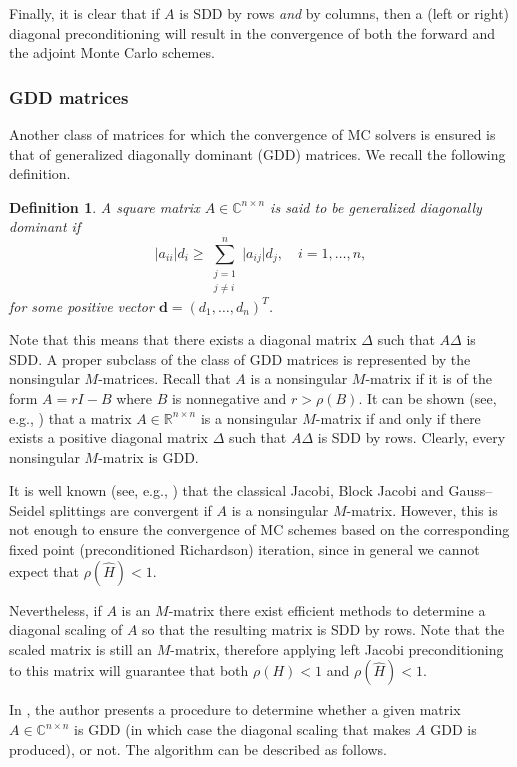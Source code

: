 \documentclass[final,leqno,onefignum,onetabnum]{siamltex1213}
\newtheorem{defn}{Definition}
\begin{document}
Finally, it is clear that if $A$ is SDD by rows {\em and} by columns, then
a (left or right) diagonal preconditioning will result in the convergence
of both the forward and the adjoint Monte Carlo schemes.

\subsubsection{GDD matrices}
\label{sec:gdd}

Another class of matrices for which the convergence of
MC solvers is ensured is that of generalized diagonally
dominant (GDD) matrices. We recall the following definition.

\begin{defn}
A square matrix $A\in\mathbb{C}^{n\times n}$ is said to be {\em generalized
diagonally dominant} if
\[
 \lvert a_{ii}\rvert d_i \ge \sum_{\substack{j=1\\j\ne i}}^n \lvert
a_{ij}\rvert
d_j, \quad i=1,\ldots,n,
\]
for some positive vector $\mathbf{d}=(d_1,\ldots,d_n)^T$.
\end{defn}

Note that this means that there exists a diagonal matrix  $\Delta$
such that $A\Delta$ is SDD.
A proper subclass of the class of GDD matrices is represented
by the nonsingular $M$-matrices.
Recall that $A$ is a nonsingular $M$-matrix if it is of the form
$A=r I - B$ where $B$ is nonnegative and $r>\rho(B)$.
It can be shown (see, e.g., \cite{BP1979}) that  a matrix
$A\in\mathbb{R}^{n\times n}$ is a nonsingular $M$-matrix if and only
if there exists a positive diagonal matrix $\Delta$ such that
$A\Delta$ is SDD by rows. Clearly, every
nonsingular $M$-matrix is GDD.

It is well known (see, e.g., \cite{Ax1994}) that the classical
Jacobi, Block Jacobi and Gauss--Seidel splittings are
convergent if $A$ is a nonsingular $M$-matrix.
However, this is not enough to ensure the
convergence of MC schemes based on the corresponding fixed point
(preconditioned Richardson) iteration, since in general
we cannot expect that $\rho(\hat{H})<1$.

Nevertheless, if $A$ is an $M$-matrix there exist efficient methods
to determine a diagonal scaling of $A$ so that the resulting matrix
is SDD by rows. Note that the scaled matrix is still an $M$-matrix,
therefore applying left Jacobi preconditioning to this matrix will
guarantee that both $\rho(H)<1$ and $\rho(\hat{H})<1$.

In \cite{Li2002}, the author presents a procedure to determine
whether a given matrix $A\in\mathbb{C}^{n\times n}$
is GDD (in which case the diagonal scaling that
makes $A$ GDD is produced), or not.
The algorithm can be described as follows.
\end{document}
